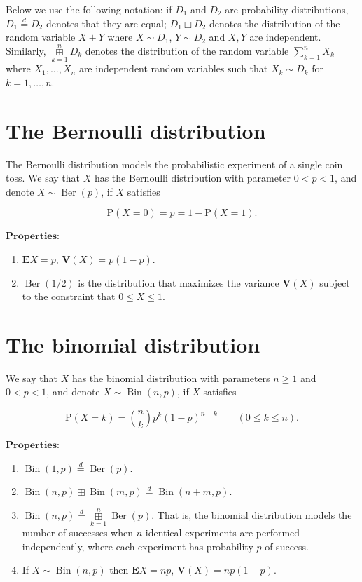 \documentclass[11pt]{report}
\theoremstyle{plain}
\theoremstyle{definition}
\begin{document}
Below we use the following notation: if $D_1$ and
$D_2$ are probability distributions,
$D_1 \stackrel{d}{=} D_2$ denotes that they are
equal; $D_1\boxplus D_2$ denotes the distribution of
the random variable $X+Y$ where $X\sim D_1$,
$Y\sim D_2$ and $X,Y$ are independent. Similarly,
$\mathop{\boxplus}\limits_{k=1}^n D_k$ denotes the
distribution of the random variable $\sum_{k=1}^n X_k$
where $X_1,\ldots,X_n$ are independent random
variables such that $X_k \sim D_k$ for $k=1,\ldots,n$.

\section{The Bernoulli distribution}
The Bernoulli distribution models the probabilistic
experiment of a single coin toss. We say that $X$ has
the Bernoulli distribution with parameter $0<p<1$,
and denote $X \sim \operatorname{Ber}(p)$, if $X$
satisfies

\[
\mathrm{P}(X=0)=p = 1-\mathrm{P}(X=1).
\]

$\textbf{Properties:}$

\begin{enumerate}[label=\arabic*.]
\item $\mathbf{E} X = p$, $\mathbf{V}(X) = p(1-p)$.

\item $\operatorname{Ber}(1/2)$ is the distribution that
maximizes the variance $\mathbf{V}(X)$ subject to the
constraint that $0\le X\le 1$.
\end{enumerate}

\section{The binomial distribution}
We say that $X$ has the binomial distribution with
parameters $n\ge 1$ and $0<p<1$, and denote
$X\sim \operatorname{Bin}(n,p)$, if $X$ satisfies

\[
\mathrm{P}(X = k) = \binom{n}{k} p^k (1-p)^{n-k} \qquad (0\le k\le n).
\]

$\textbf{Properties:}$

\begin{enumerate}[label=\arabic*.]
\item $\operatorname{Bin}(1,p) \stackrel{d}{=}
\operatorname{Ber}(p)$.

\item $\operatorname{Bin}(n,p) \boxplus
\operatorname{Bin}(m,p) \stackrel{d}{=}
\operatorname{Bin}(n+m,p)$.

\item $\operatorname{Bin}(n,p) \stackrel{d}{=}
\mathop{\boxplus}\limits_{k=1}^n
\operatorname{Ber}(p)$.
That is, the binomial distribution models the number
of successes when $n$ identical experiments are
performed independently, where each experiment has
probability $p$ of success.

\item If $X\sim \operatorname{Bin}(n,p)$ then
$\mathbf{E} X = np$, $\mathbf{V}(X) = np(1-p)$.
\end{enumerate}
\end{document}
